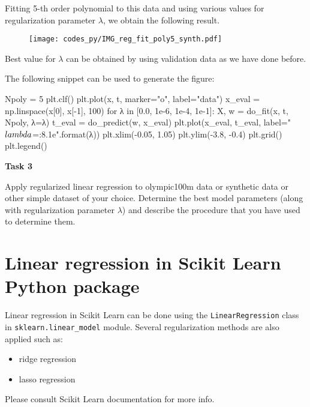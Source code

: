 \documentclass[b5paper,12pt]{article} %
\newcommand{\pyinline}[1]{\texttt{#1}}
\begin{document}
Fitting 5-th order polynomial to this data and using various values for regularization
parameter $\lambda$, we obtain the following result.
\begin{figure}[H]
\begin{center}
\texttt{[image: codes\_py/IMG\_reg\_fit\_poly5\_synth.pdf]}
\end{center}
\end{figure}
Best value for $\lambda$ can be obtained by using validation data as we have done before.

The following snippet can be used to generate the figure:
\begin{pythoncode}
Npoly = 5
plt.clf()
plt.plot(x, t, marker="o", label="data")
x_eval = np.linspace(x[0], x[-1], 100)
for λ in [0.0, 1e-6, 1e-4, 1e-1]:
    X, w = do_fit(x, t, Npoly, λ=λ)
    t_eval = do_predict(w, x_eval)
    plt.plot(x_eval, t_eval, label="$\\lambda$={:8.1e}".format(λ))
plt.xlim(-0.05, 1.05)
plt.ylim(-3.8, -0.4)
plt.grid()
plt.legend()
\end{pythoncode}

\begin{mdframed}
\textbf{Task 3}

Apply regularized linear regression to olympic100m data or synthetic data or other simple
dataset of your choice. Determine the best model parameters (along with regularization
parameter $\lambda$)
and describe the procedure that you have used to determine them.
\end{mdframed}


\section{Linear regression in Scikit Learn Python package}

Linear regression in Scikit Learn \cite{scikit-learn} can be done using the
\pyinline{LinearRegression} class in
\pyinline{sklearn.linear_model} module.
Several regularization methods are also applied such as:
\begin{itemize}
\item ridge regression
\item lasso regression
\end{itemize}
Please consult Scikit Learn documentation for more info.



\end{document}
